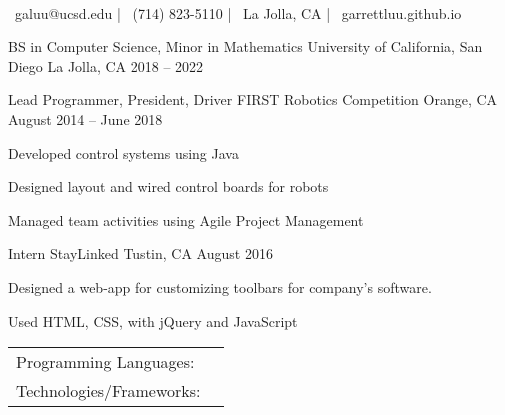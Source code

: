 \documentclass[]{awesome-cv}
\begin{document}
    
\begin{center}
	  \\
	\vspace{2mm}
	{\faEnvelope\ galuu@ucsd.edu} | {\faMobile\ (714) 823-5110} | {\faMapMarker\ La Jolla, CA} | {\faLink\ garrettluu.github.io}
\end{center}
\begin{cventries}
	\cventry
	{BS in Computer Science, Minor in Mathematics}
	{University of California, San Diego}
	{La Jolla, CA}
	{2018 – 2022}
	{}
\end{cventries}

\vspace{-2mm}
\begin{cventries}
	\cventry
	{Lead Programmer, President, Driver}
	{FIRST Robotics Competition}
	{Orange, CA}
	{August 2014 – June 2018}
	{\begin{cvitems}
		\item {Developed control systems using Java}
		\item {Designed layout and wired control boards for robots}
		\item {Managed team activities using Agile Project Management}
		\end{cvitems}}
	\cventry
	{Intern}
	{StayLinked}
	{Tustin, CA}
	{August 2016}
	{\begin{cvitems}
		\item {Designed a web-app for customizing toolbars for company’s software.}
		\item {Used HTML, CSS, with jQuery and JavaScript}
		\end{cvitems}}
\end{cventries}
\begin{cventries}
	\cventry
	{}
	{\def\arraystretch{1.15}{\begin{tabular}{ l l }
		Programming Languages:  & {\skill{ Java, C, HTML, CSS, Javascript, Kotlin}} \\
		Technologies/Frameworks:  & {\skill{ Git, Linux/Unix, Vim, PID, jQuery, Node.js, Express}} \\
		\end{tabular}}}
	{}
	{}
	{}
\end{cventries}
\end{document}
